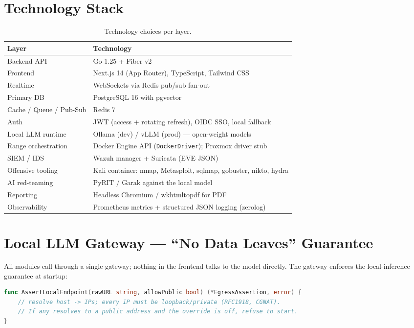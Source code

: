 \documentclass[11pt,a4paper]{article}
\begin{document}
\section{Technology Stack}
\begin{table}[h]
\centering
\small
\begin{tabular}{@{}ll@{}}
\toprule
\textbf{Layer} & \textbf{Technology}\\
\midrule
Backend API & Go 1.25 + Fiber v2\\
Frontend & Next.js 14 (App Router), TypeScript, Tailwind CSS\\
Realtime & WebSockets via Redis pub/sub fan-out\\
Primary DB & PostgreSQL 16 with pgvector\\
Cache / Queue / Pub-Sub & Redis 7\\
Auth & JWT (access + rotating refresh), OIDC SSO, local fallback\\
Local LLM runtime & Ollama (dev) / vLLM (prod) --- open-weight models\\
Range orchestration & Docker Engine API (\texttt{DockerDriver}); Proxmox driver stub\\
SIEM / IDS & Wazuh manager + Suricata (EVE JSON)\\
Offensive tooling & Kali container: nmap, Metasploit, sqlmap, gobuster, nikto, hydra\\
AI red-teaming & PyRIT / Garak against the local model\\
Reporting & Headless Chromium / wkhtmltopdf for PDF\\
Observability & Prometheus metrics + structured JSON logging (zerolog)\\
\bottomrule
\end{tabular}
\caption{Technology choices per layer.}
\end{table}

\section{Local LLM Gateway --- ``No Data Leaves'' Guarantee}
All modules call through a single gateway; nothing in the frontend talks to
the model directly. The gateway enforces the local-inference guarantee at
startup:

\begin{lstlisting}[language=Go, caption={Egress guard (simplified).}]
func AssertLocalEndpoint(rawURL string, allowPublic bool) (*EgressAssertion, error) {
    // resolve host -> IPs; every IP must be loopback/private (RFC1918, CGNAT).
    // If any resolves to a public address and the override is off, refuse to start.
}
\end{lstlisting}
\end{document}
